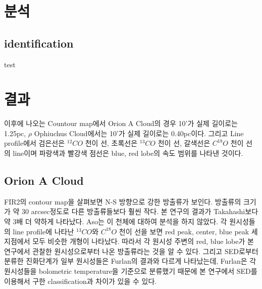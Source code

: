 \section{분석}

\subsection{identification}

test


\section{결과}

이후에 나오는 Countour map에서 Orion A Cloud의 경우 10'가 실제 길이로는 1.25pc, $\rho$ Ophiuchus Cloud에서는 10'가 실제 길이로는 0.40pc이다. 그리고 Line profile에서 검은선은 $^{12}CO$ 천이 선, 초록선은 $^{13}CO$ 천이 선, 갈색선은 $C^{18}O$ 천이 선의 line이며 파랑색과 빨강색 점선은 blue, red lobe의 속도 범위를 나타낸 것이다.


\subsection{Orion A Cloud}


FIR2의 contour map을 살펴보면 N-S 방향으로 강한 방출류가 보인다. 방출류의 크기가 약 30 arcsec정도로 다른 방출류들보다 훨씬 작다. 본 연구의 결과가 Takahashi보다 약 3배 더 약하게 나타났다. Aso는 이 천체에 대하여 분석을 하지 않았다.
각 원시성들의 line profile에 나타난 $^{13}CO$와 $C^{18}O$ 천이 선을 보면 red peak, center, blue peak 세 지점에서 모두 비슷한 개형이 나타났다. 따라서 각 원시성 주변의 red, blue lobe가 본 연구에서 관찰한 원시성으로부터 나온 방출류라는 것을 알 수 있다. 그리고 SED로부터 분류한 진화단계가 일부 원시성들은 Furlan의 결과와 다르게 나타났는데, Furlan은 각 원시성들을 bolometric temperature을 기준으로 분류했기 때문에 본 연구에서 SED를 이용해서 구한 classification과 차이가 있을 수 있다. \cite{bontemps1996evolution}


